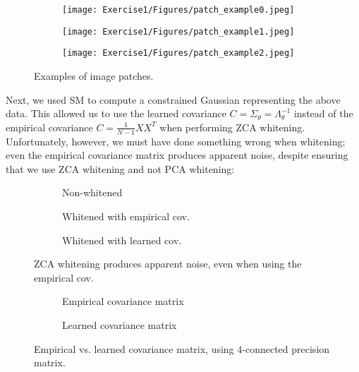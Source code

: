 \documentclass[a4paper]{article}
\theoremstyle{definition}
\theoremstyle{plain}
\begin{document}
\begin{figure}[H]
	\centering
	\begin{subfigure}[b]{0.32\textwidth}
		\centering
		\texttt{[image: Exercise1/Figures/patch\_example0.jpeg]}
	\end{subfigure}
	\hfill
	\begin{subfigure}[b]{0.32\textwidth}
		\centering
		\texttt{[image: Exercise1/Figures/patch\_example1.jpeg]}
	\end{subfigure}
	\hfill
	\begin{subfigure}[b]{0.32\textwidth}
		\centering
		\texttt{[image: Exercise1/Figures/patch\_example2.jpeg]}
	\end{subfigure}
	\caption{Examples of image patches.}
	\label{loss_SM_fig}
\end{figure}


Next, we used SM to compute a constrained Gaussian representing the above data. This allowed us to use the learned covariance $C = \Sigma_\theta = \Lambda_\theta^{-1}$ instead of the empirical covariance $C = \frac{1}{N-1} XX^T$ when performing ZCA whitening.  Unfortunately, however, we must have done something wrong when whitening; even the empirical covariance matrix produces apparent noise, despite ensuring that we use ZCA whitening and not PCA whitening:

\begin{figure}[H]
	\centering
	\begin{subfigure}[b]{0.32\textwidth}
		\centering
		
		\caption{Non-whitened}
	\end{subfigure}
	\hfill
	\begin{subfigure}[b]{0.32\textwidth}
		\centering
		
		\caption{Whitened with empirical cov.}
	\end{subfigure}
	\hfill
	\begin{subfigure}[b]{0.32\textwidth}
		\centering
		
		\caption{Whitened with learned cov.}
	\end{subfigure}
	\caption{ZCA whitening produces apparent noise, even when using the empirical cov.}
	\label{ex2_whitening_fig}
\end{figure}

\begin{figure}[H]
	\centering
	\begin{subfigure}[b]{0.49\textwidth}
		
		\caption{Empirical covariance matrix}
	\end{subfigure}
	\hfill
	\begin{subfigure}[b]{0.49\textwidth}
		
		\caption{Learned covariance matrix}
	\end{subfigure}
	\caption{Empirical vs. learned covariance matrix, using 4-connected precision matrix.}
	\label{ex2_covmatrices_fig}
\end{figure}
\end{document}
